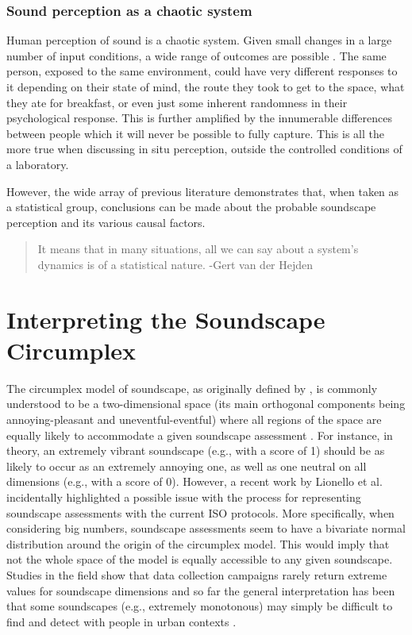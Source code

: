 
\subsubsection{Sound perception as a chaotic system}

Human perception of sound is a chaotic system. Given small changes in a large number of input conditions, a wide range of outcomes are possible . The same person, exposed to the same environment, could have very different responses to it depending on their state of mind, the route they took to get to the space, what they ate for breakfast, or even just some inherent randomness in their psychological response. This is further amplified by the innumerable differences between people which it will never be possible to fully capture. This is all the more true when discussing in situ perception, outside the controlled conditions of a laboratory.

However, the wide array of previous literature demonstrates that, when taken as a statistical group, conclusions can be made about the probable soundscape perception and its various causal factors.

\begin{quote}
    It means that in many situations, all we can say about a system's dynamics is of a statistical nature. -Gert van der Hejden
\end{quote}

\section{Interpreting the Soundscape Circumplex}
The circumplex model of soundscape, as originally defined by \citet{Axelsson2010principal}, is commonly understood to be a two-dimensional space (its main orthogonal components being annoying-pleasant and uneventful-eventful) where all regions of the space are equally likely to accommodate a given soundscape assessment \citep{Aletta2016Soundscape}. For instance, in theory, an extremely vibrant soundscape (e.g., with a score of 1) should be as likely to occur as an extremely annoying one, as well as one neutral on all dimensions (e.g., with a score of 0). However, a recent work by Lionello et al. \citep{Lionello2021Introducing} incidentally highlighted a possible issue with the process for representing soundscape assessments with the current ISO protocols. More specifically, when considering big numbers, soundscape assessments seem to have a bivariate normal distribution around the origin of the circumplex model. This would imply that not the whole space of the model is equally accessible to any given soundscape. Studies in the field show that data collection campaigns rarely return extreme values for soundscape dimensions \citep{Mancini2021Soundwalk} and so far the general interpretation has been that some soundscapes (e.g., extremely monotonous) may simply be difficult to find and detect with people in urban contexts \citep{Sun2019Classification}. 

